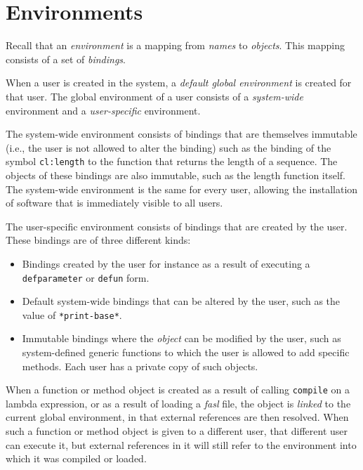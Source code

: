 \chapter{Environments}
\label{chap-environments}

Recall that an \emph{environment} is a mapping from \emph{names} to
\emph{objects}.  This mapping consists of a set of \emph{bindings}. 

When a user is created in the system, a \emph{default global
  environment} is created for that user.   The global environment of a
user consists of a \emph{system-wide} environment and a
\emph{user-specific} environment.

The system-wide environment consists of bindings that are themselves
immutable (i.e., the user is not allowed to alter the binding) such as
the binding of the symbol \texttt{cl:length} to the function that
returns the length of a sequence.  The objects of these bindings are
also immutable, such as the length function itself.  The system-wide
environment is the same for every user, allowing the installation of
software that is immediately visible to all users. 

The user-specific environment consists of bindings that are created by
the user.  These bindings are of three different kinds:

\begin{itemize}
\item Bindings created by the user for instance as a result of
  executing a \texttt{defparameter} or \texttt{defun} form.
\item Default system-wide bindings that can be altered by the user,
  such as the value of \texttt{*print-base*}.
\item Immutable bindings where the \emph{object} can be modified by
  the user, such as system-defined generic functions to which the user
  is allowed to add specific methods.  Each user has a private copy of
  such objects.
\end{itemize}

When a function or method object is created as a result of calling
\texttt{compile} on a lambda expression, or as a result of loading a
\emph{fasl} file, the object is \emph{linked} to the current global
environment, in that external references are then resolved.  When such
a function or method object is given to a different user, that
different user can execute it, but external references in it will
still refer to the environment into which it was compiled or loaded.

